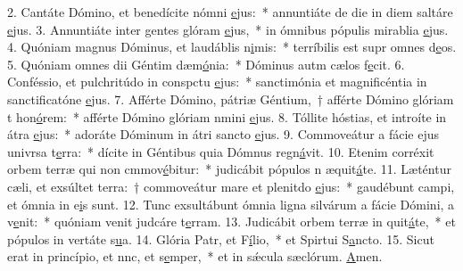 2. Cantáte Dómino, et benedícite nómni \uline{e}jus:~* annuntiáte de die in diem saltáre \uline{e}jus.
3. Annuntiáte inter gentes glóram \uline{e}jus,~* in ómnibus pópulis mirablia \uline{e}jus.
4. Quóniam magnus Dóminus, et laudáblis n\uline{i}mis:~* terríbilis est supr omnes d\uline{e}os.
5. Quóniam omnes dii Géntim dæm\uline{ó}nia:~* Dóminus autm cælos f\uline{e}cit.
6. Conféssio, et pulchritúdo in conspctu \uline{e}jus:~* sanctimónia et magnificéntia in sanctificatóne \uline{e}jus.
7. Afférte Dómino, pátriæ Géntium,~† afférte Dómino glóriam t hon\uline{ó}rem:~* afférte Dómino glóriam nmini \uline{e}jus.
8. Tóllite hóstias, et introíte in átra \uline{e}jus:~* adoráte Dóminum in átri sancto \uline{e}jus.
9. Commoveátur a fácie ejus univrsa t\uline{e}rra:~* dícite in Géntibus quia Dómnus regn\uline{á}vit.
10. Etenim corréxit orbem terræ qui non cmmov\uline{é}bitur:~* judicábit pópulos n æquit\uline{á}te.
11. Læténtur cæli, et exsúltet terra:~† commoveátur mare et plenitdo \uline{e}jus:~* gaudébunt campi, et ómnia  in e\uline{i}s sunt.
12. Tunc exsultábunt ómnia ligna silvárum a fácie Dómini, a v\uline{e}nit:~* quóniam venit judcáre t\uline{e}rram.
13. Judicábit orbem terræ in quit\uline{á}te,~* et pópulos in vertáte s\uline{u}a.
14. Glória Patr, et F\uline{í}lio,~* et Spirtui S\uline{a}ncto.
15. Sicut erat in princípio, et nnc, et s\uline{e}mper,~* et in sǽcula sæclórum. \uline{A}men.
